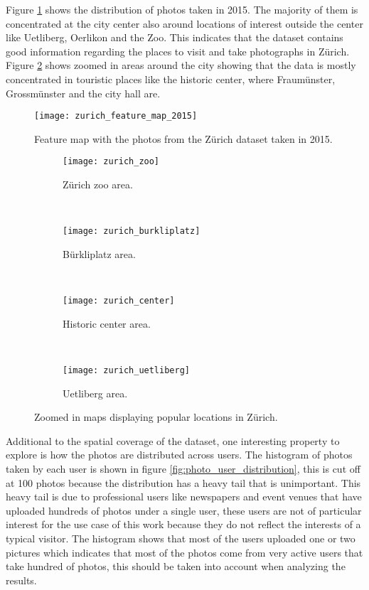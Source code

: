 Figure \ref{fig:heatmap_zurich} shows the distribution of photos taken in 2015. The majority of them is concentrated at the city center also around locations of interest outside the center like Uetliberg, Oerlikon and the Zoo. This indicates that the dataset contains good information regarding the places to visit and take photographs in Zürich. Figure \ref{fig:heatmap_zurich_zoom} shows zoomed in areas around the city showing that the data is mostly concentrated in touristic places like the historic center, where Fraumünster, Grossmünster and the city hall are.

\begin{figure}
  \centering
  \texttt{[image: zurich\_feature\_map\_2015]}
  \caption{Feature map with the photos from the Zürich dataset taken in 2015.}
  \label{fig:heatmap_zurich}
\end{figure}

\begin{figure}
  \centering
  \begin{subfigure}[b]{0.45\textwidth}
    \texttt{[image: zurich\_zoo]}
    \caption{Zürich zoo area.}
  \end{subfigure}
  ~
  \begin{subfigure}[b]{0.45\textwidth}
    \texttt{[image: zurich\_burkliplatz]}
    \caption{Bürkliplatz area.}
  \end{subfigure}
  \hfill \\
  \begin{subfigure}[b]{0.45\textwidth}
    \texttt{[image: zurich\_center]}
    \caption{Historic center area.}
  \end{subfigure}
  ~
  \begin{subfigure}[b]{0.45\textwidth}
    \texttt{[image: zurich\_uetliberg]}
    \caption{Uetliberg area.}
  \end{subfigure}
  \caption{Zoomed in maps displaying popular locations in Zürich.}
  \label{fig:heatmap_zurich_zoom}
\end{figure}

Additional to the spatial coverage of the dataset, one interesting property to explore is how the photos are distributed across users. The histogram of photos taken by each user is shown in figure \ref{fig:photo_user_distribution}, this is cut off at 100 photos because the distribution has a heavy tail that is unimportant. This heavy tail is due to professional users like newspapers and event venues that have uploaded hundreds of photos under a single user, these users are not of particular interest for the use case of this work because they do not reflect the interests of a typical visitor. The histogram shows that most of the users uploaded one or two pictures which indicates that most of the photos come from very active users that take hundred of photos, this should be taken into account when analyzing the results.

